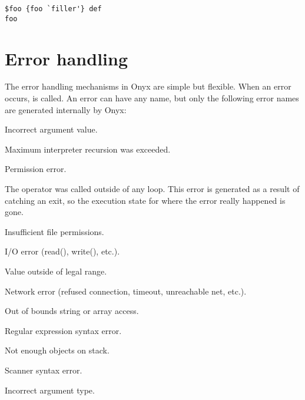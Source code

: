 \begin{verbatim}
$foo {foo `filler'} def
foo
\end{verbatim}

\section{Error handling}

The error handling mechanisms in Onyx are simple but flexible.  When an error
occurs,  is called.  An error can
have any name, but only the following error names are generated internally by
Onyx:
\begin{description}
\label{argcheck}
\item[argcheck: ] Incorrect argument value.
\label{estackoverflow}
\item[estackoverflow: ] Maximum interpreter recursion was exceeded.
\label{invalidaccess}
\item[invalidaccess: ] Permission error.
\label{invalidexit}
\item[invalidexit: ] The  operator was called outside of any
loop.  This error is generated as a result of catching an exit, so the execution
state for where the error really happened is gone.
\label{invalidfileaccess}
\item[invalidfileaccess: ] Insufficient file permissions.
\label{ioerror}
\item[ioerror: ] I/O error (read(), write(), etc.).
\label{limitcheck}
\item[limitcheck: ] Value outside of legal range.
\label{neterror}
\item[neterror: ] Network error (refused connection, timeout, unreachable net,
etc.).
\label{rangecheck}
\item[rangecheck: ] Out of bounds string or array access.
\label{regexerror}
\item[regexerror: ] Regular expression syntax error.
\label{stackunderflow}
\item[stackunderflow: ] Not enough objects on stack.
\label{syntaxerror}
\item[syntaxerror: ] Scanner syntax error.
\label{typecheck}
\item[typecheck: ] Incorrect argument type.

\end{description}
